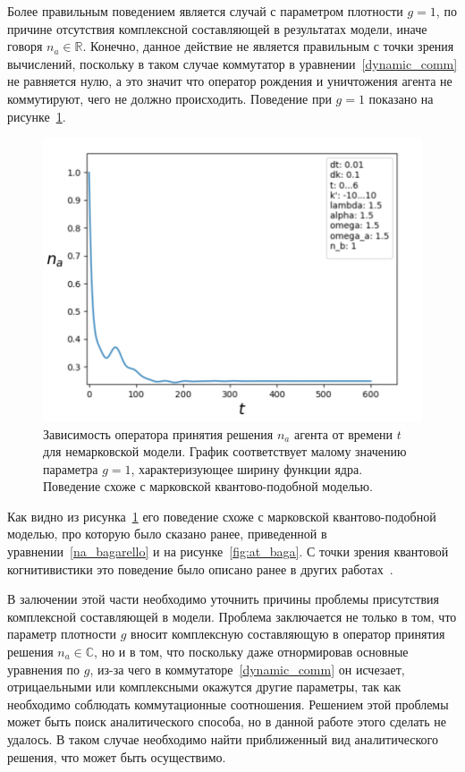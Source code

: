 Более правильным поведением является случай с параметром плотности $g = 1$, по причине отсутствия
комплексной составляющей в результатах модели, иначе говоря $n_{a} \in \mathbb{R}$.
Конечно, данное действие не является правильным с точки зрения вычислений, поскольку в таком случае
коммутатор в уравнении~\eqref{dynamic_comm} не равняется нулю, а это значит что оператор рождения и
уничтожения агента не коммутируют, чего не должно происходить.
Поведение при $g = 1$ показано на рисунке~\ref{fig:fr_real_g_15}.
\begin{figure}[h!]
    \centering
    \captionsetup{justification=centering}
    \includegraphics[width=0.7\linewidth]{pictures/result_first_4.png}
    \caption{Зависимость оператора принятия решения $n_{a}$ агента от времени $t$ для немарковской модели.
    График соответствует малому значению параметра $g = 1$, характеризующее ширину функции ядра.
    Поведение схоже с марковской квантово-подобной моделью.}
    \label{fig:fr_real_g_15}
\end{figure}
Как видно из рисунка~\ref{fig:fr_real_g_15} его поведение схоже с марковской квантово-подобной моделью,
про которую было сказано ранее, приведенной в уравнении~\eqref{na_bagarello} и на рисунке~\ref{fig:at_baga}.
С точки зрения квантовой когнитивистики это поведение было описано ранее в других
работах~\citep{bagarello2015quantum,bagarello2018quantum}.

В залючении этой части необходимо уточнить причины проблемы присутствия комплексной составляющей в модели.
Проблема заключается не только в том, что параметр плотности $g$ вносит комплексную составляющую в оператор
принятия решения $n_{a} \in \mathbb{C}$, но и в том, что поскольку даже отнормировав основные уравнения
по $g$, из-за чего в коммутаторе~\eqref{dynamic_comm} он исчезает, отрицаельными или комплексными окажутся
другие параметры, так как необходимо соблюдать коммутационные соотношения.
Решением этой проблемы может быть поиск аналитического способа, но в данной работе этого сделать не удалось.
В таком случае необходимо найти приближенный вид аналитического решения, что может быть осуществимо.

